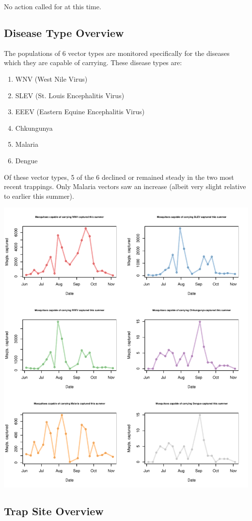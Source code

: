 \documentclass{article}
\begin{document}
No action called for at this time.
\newpage
\begin{center}
\section*{Disease Type Overview}

\end{center}
The populations of 6 vector types are monitored specifically for the diseases which they are capable of carrying.  These disease types are:\\
\begin{enumerate}
  \item WNV (West Nile Virus)
  \item SLEV (St. Louis Encephalitis Virus)
  \item EEEV (Eastern Equine Encephalitis Virus)
  \item Chkungunya
  \item Malaria
  \item Dengue\\
\end{enumerate}
Of these vector types, 5 of the 6 declined or remained steady in the two most recent trappings.  Only Malaria vectors saw an increase (albeit very slight relative to earlier this summer).
\begin{center}
\includegraphics{mosq04nov13-005}
\end{center}
\newpage
\begin{center}
\section*{Trap Site Overview}

\end{center}
\end{document}
